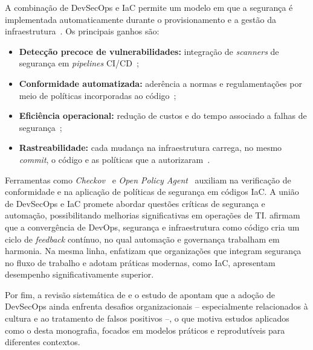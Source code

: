 A combinação de DevSecOps e IaC permite um modelo em que a segurança é implementada automaticamente durante o provisionamento e a gestão da infraestrutura~. Os principais ganhos são:

\begin{itemize}
    \item \textbf{Detecção precoce de vulnerabilidades:} integração de \textit{scanners} de segurança em \textit{pipelines} CI/CD~;
    \item \textbf{Conformidade automatizada:} aderência a normas e regulamentações por meio de políticas incorporadas ao código~;
    \item \textbf{Eficiência operacional:} redução de custos e do tempo associado a falhas de segurança~;
    \item \textbf{Rastreabilidade:} cada mudança na infraestrutura carrega, no mesmo \textit{commit}, o código e as políticas que a autorizaram~.
\end{itemize}

Ferramentas como \textit{Checkov}~ e \textit{Open Policy Agent}~ auxiliam na verificação de conformidade e na aplicação de políticas de segurança em códigos IaC. A união de DevSecOps e IaC promete abordar questões críticas de segurança e automação, possibilitando melhorias significativas em operações de TI.  afirmam que a convergência de DevOps, segurança e infraestrutura como código cria um ciclo de \textit{feedback} contínuo, no qual automação e governança trabalham em harmonia. Na mesma linha,  enfatizam que organizações que integram segurança no fluxo de trabalho e adotam práticas modernas, como IaC, apresentam desempenho significativamente superior.

Por fim, a revisão sistemática de  e o estudo de  apontam que a adoção de DevSecOps ainda enfrenta desafios organizacionais -- especialmente relacionados à cultura e ao tratamento de falsos positivos --, o que motiva estudos aplicados como o desta monografia, focados em modelos práticos e reprodutíveis para diferentes contextos.
